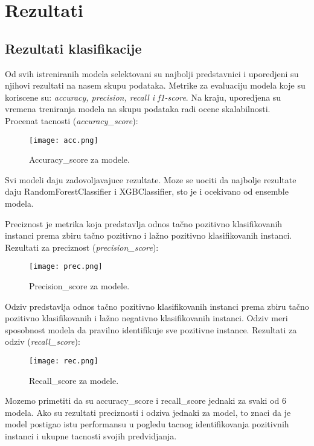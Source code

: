 \documentclass[10pt]{article}
\begin{document}
\newpage
\section{Rezultati}
\subsection*{Rezultati klasifikacije}
Od svih istreniranih modela selektovani su najbolji predstavnici i uporedjeni su njihovi rezultati na nasem skupu podataka. Metrike za evaluaciju modela koje su koriscene su: \textit{accuracy, precision, recall i f1-score}. Na kraju, uporedjena su vremena treniranja modela na skupu podataka radi ocene skalabilnosti.\\

Procenat tacnosti (\textit{accuracy\_score}):
\begin{figure}[h]
    \centering
    \texttt{[image: acc.png]}
    \caption{Accuracy\_score za modele.}
    \label{Slika1}
\end{figure}

Svi modeli daju zadovoljavajuce rezultate. Moze se uociti da najbolje rezultate daju RandomForestClassifier i XGBClassifier, sto je i ocekivano od ensemble modela.\\
\pagebreak

Preciznost je metrika koja predstavlja odnos tačno pozitivno klasifikovanih instanci prema zbiru tačno pozitivno i lažno pozitivno klasifikovanih instanci. Rezultati za preciznost (\textit{precision\_score}):
\begin{figure}[h]
    \centering
    \texttt{[image: prec.png]}
    \caption{Precision\_score za modele.}
    \label{Slika2}
\end{figure}

Odziv predstavlja odnos tačno pozitivno klasifikovanih instanci prema zbiru tačno pozitivno klasifikovanih i lažno negativno klasifikovanih instanci. Odziv meri sposobnost modela da pravilno identifikuje sve pozitivne instance. Rezultati za odziv (\textit{recall\_score}):
\begin{figure}[h]
    \centering
    \texttt{[image: rec.png]}
    \caption{Recall\_score za modele.}
    \label{Slika3}
\end{figure}

Mozemo primetiti da su accuracy\_score i recall\_score jednaki za svaki od 6 modela. Ako su rezultati preciznosti i odziva jednaki za model, to znaci da je model postigao istu performansu u pogledu tacnog identifikovanja pozitivnih instanci i ukupne tacnosti svojih predvidjanja.\\
\end{document}
